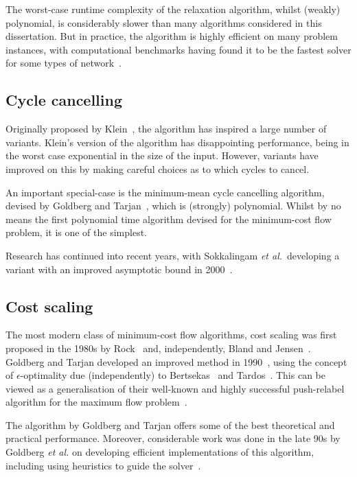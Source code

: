 The worst-case runtime complexity of the relaxation algorithm, whilst (weakly) polynomial, is considerably slower than many algorithms considered in this dissertation. But in practice, the algorithm is highly efficient on many problem instances, with computational benchmarks having found it to be the fastest solver for some types of network~\cite{KiralyKovacs:2012}.

\subsection{Cycle cancelling}

Originally proposed by Klein~\cite{Klein:1967}, the algorithm has inspired a large number of variants. Klein's version of the algorithm has disappointing performance, being in the worst case exponential in the size of the input. However, variants have improved on this by making careful choices as to which cycles to cancel.

An important special-case is the minimum-mean cycle cancelling algorithm, devised by Goldberg and Tarjan~\cite{Goldberg:1989}, which is (strongly) polynomial. Whilst by no means the first polynomial time algorithm devised for the minimum-cost flow problem, it is one of the simplest.

Research has continued into recent years, with Sokkalingam \textit{et al.}\ developing a variant with an improved asymptotic bound in 2000~\cite{Sokkalingam:2000}.

\subsection{Cost scaling}

The most modern class of minimum-cost flow algorithms, cost scaling was first proposed in the 1980s by Rock~\cite{Rock:1980} and, independently, Bland and Jensen~\cite{Bland:1985}. Goldberg and Tarjan developed an improved method in 1990~\cite{Goldberg:1990}, using the concept of $\epsilon$-optimality due (independently) to Bertsekas~\cite{Bertsekas:1979} and Tardos~\cite{Tardos:1985}. This can be viewed as a generalisation of their well-known and highly successful push-relabel algorithm for the maximum flow problem~\cite{Goldberg:1988}.

The algorithm by Goldberg and Tarjan offers some of the best theoretical and practical performance. Moreover, considerable work was done in the late 90s by Goldberg \textit{et al.} on developing efficient implementations of this algorithm, including using heuristics to guide the solver~\cite{Goldberg:1997,Bunnagel:1998}.


